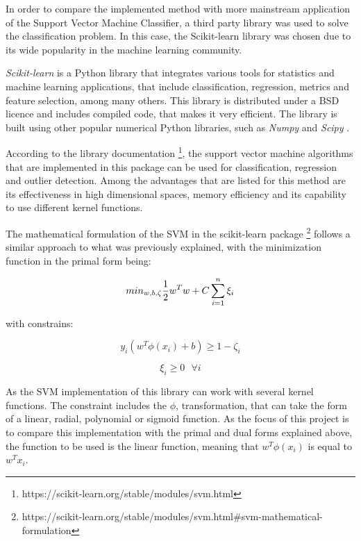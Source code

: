 \documentclass[11pt,twocolumn,letterpaper]{article}
\begin{document}
In order to compare the implemented method with more mainstream application of the Support Vector Machine Classifier, a third party library was used to solve the classification problem. In this case, the Scikit-learn library was chosen due to its wide popularity in the machine learning community.

\textit{Scikit-learn} is a Python library that integrates various tools for statistics and machine learning applications, that include classification, regression, metrics and feature selection, among many others. This library is distributed under a BSD licence and includes compiled code, that makes it very efficient. The library is built using other popular numerical Python libraries, such as \textit{Numpy} and \textit{Scipy} \cite{Pedregosa2011}.

According to the library documentation \footnote{https://scikit-learn.org/stable/modules/svm.html}, the support vector machine algorithms that are implemented in this package can be used for classification, regression and outlier detection. Among the advantages that are listed for this method are its effectiveness in high dimensional spaces, memory efficiency and its capability to use different kernel functions.

The mathematical formulation of the SVM in the scikit-learn package
\footnote{https://scikit-learn.org/stable/modules/svm.html\#svm-mathematical-formulation}
 follows a similar approach to what was previously explained, with the minimization function in the primal form being:

 
 \begin{equation}
 min_ {w, b, \zeta} \frac{1}{2} w^T w + C \sum_{i=1}^{n} \xi_i\\
  \end{equation}
 

 with constrains:
 
 \begin{equation}
 	y_i (w^T \phi (x_i) + b) \geq 1 - \zeta_i
 \end{equation}
 
 \begin{equation}
 	\xi_i  \geq 0 \:\:\: \forall i
 \end{equation}
 
As the SVM implementation of this library can work with several kernel functions. The constraint includes the $\phi$, transformation, that can take the form of a linear, radial, polynomial or sigmoid function. As the focus of this project is to compare this implementation with the primal and dual forms explained above, the function to be used is the linear function, meaning that $w^T \phi (x_i)$ is equal to $w^T x_i$.
\end{document}
